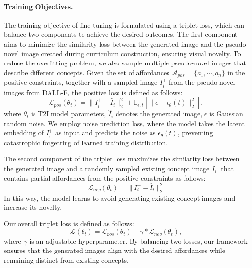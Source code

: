 \paragraph{Training Objectives.}
The training objective of fine-tuning is formulated using a triplet loss, which can balance two components to achieve the desired outcomes. The first component aims to minimize the similarity loss between the generated image and the pseudo-novel image created during curriculum construction, ensuring visual novelty. To reduce the overfitting problem, we also sample multiple pseudo-novel images that describe different concepts. Given the set of affordances $\mathcal{A}_{pos} = \{a_1, \cdots, a_n\}$ in the positive constraints, together with a sampled image $I_i^{+}$ from the pseudo-novel images from DALL-E, the positive loss is defined as follows:
\begin{equation}
    \mathcal{L}_{pos}(\theta_{t}) = \| I_{i}^{+} - \hat{I}_{i} \|^2_2 + \mathbb{E}_{ \epsilon, t} \left[ \|\epsilon - \epsilon_\theta(t)\|^2_2 \right],
\end{equation}
where $\theta_{t}$ is T2I model parameters, $\hat{I}_{i}$ denotes the generated image, $\epsilon$ is Gaussian random noise. We employ noise prediction loss, where the model takes the latent embedding of $I_{i}^{+}$ as input and predicts the noise as $\epsilon_\theta(t)$, preventing catastrophic forgetting of learned training distribution.

The second component of the triplet loss maximizes the similarity loss between the generated image and a randomly sampled existing concept image $I_{i}^{-}$ that contains partial affordances from the positive constraints as follows:
\begin{equation}
    \mathcal{L}_{neg}(\theta_{t}) = \| I_{i}^{-} - \hat{I}_{i} \|^2_2
\end{equation}
In this way, the model learns to avoid generating existing concept images and increase its novelty.

Our overall triplet loss is defined as follows:
\begin{equation}
    \mathcal{L}(\theta_{t}) = \mathcal{L}_{pos}(\theta_{t}) - \gamma * \mathcal{L}_{neg}(\theta_{t}),
\end{equation}
where $\gamma$ is an adjustable hyperparameter.
By balancing two losses, our framework ensures that the generated images align with the desired affordances while remaining distinct from existing concepts.

